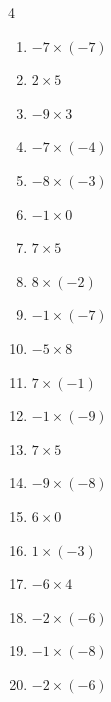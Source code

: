 \begin{multicols}{4}
\begin{enumerate}
  \item $-7\times (-7)$
        \phantom{$=49$}

  \item $2\times 5$
        \phantom{$=10$}

  \item $-9\times 3$
        \phantom{$=-27$}

  \item $-7\times (-4)$
        \phantom{$=28$}

  \item $-8\times (-3)$
        \phantom{$=24$}

  \item $-1\times 0$
        \phantom{$=0$}

  \item $7\times 5$
        \phantom{$=35$}

  \item $8\times (-2)$
        \phantom{$=-16$}

  \item $-1\times (-7)$
        \phantom{$=7$}

  \item $-5\times 8$
        \phantom{$=-40$}

  \item $7\times (-1)$
        \phantom{$=-7$}

  \item $-1\times (-9)$
        \phantom{$=9$}

  \item $7\times 5$
        \phantom{$=35$}

  \item $-9\times (-8)$
        \phantom{$=72$}

  \item $6\times 0$
        \phantom{$=0$}

  \item $1\times (-3)$
        \phantom{$=-3$}

  \item $-6\times 4$
        \phantom{$=-24$}

  \item $-2\times (-6)$
        \phantom{$=12$}

  \item $-1\times (-8)$
        \phantom{$=8$}

\columnbreak %

\resetques

  \item $-2\times (-6)$
        \phantom{$=12$}


\end{enumerate}
\end{multicols}
